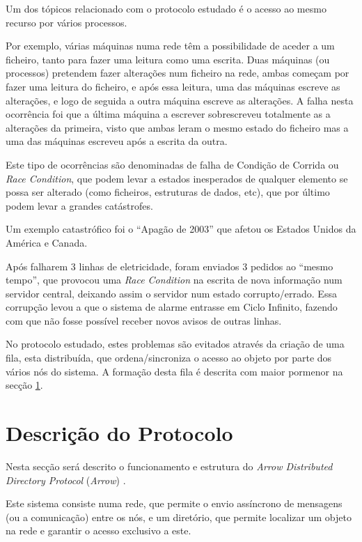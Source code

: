 Um dos tópicos relacionado com o protocolo estudado é o acesso ao mesmo recurso por vários processos.

Por exemplo, várias máquinas numa rede têm a possibilidade de aceder a um ficheiro, tanto para fazer uma leitura como uma escrita.
Duas máquinas (ou processos) pretendem fazer alterações num ficheiro na rede, ambas começam por fazer uma leitura do ficheiro, e após essa leitura, uma das máquinas escreve as alterações, e logo de seguida a outra máquina escreve as alterações. A falha nesta ocorrência foi que a última máquina a escrever sobrescreveu totalmente as a alterações da primeira, visto que ambas leram o mesmo estado do ficheiro mas a uma das máquinas escreveu após a escrita da outra.

Este tipo de ocorrências são denominadas de falha de Condição de Corrida ou \emph{Race Condition},
que podem levar a estados inesperados de qualquer elemento se possa ser alterado (como ficheiros, estruturas de dados, etc),
que por último podem levar a grandes catástrofes.

Um exemplo catastrófico foi o ``Apagão de 2003'' \cite{blackout} que afetou os Estados Unidos da América e Canada. 

Após falharem 3 linhas de eletricidade, foram enviados 3 pedidos ao ``mesmo tempo'', que provocou uma \emph{Race Condition} na escrita de nova informação num servidor central, deixando assim o servidor num estado corrupto/errado.
Essa corrupção levou a que o sistema de alarme entrasse em Ciclo Infinito, fazendo com que não fosse possível receber novos avisos de outras linhas.

No protocolo estudado, estes problemas são evitados através da criação de uma fila, esta distribuída, que ordena/sincroniza o acesso ao objeto por parte dos vários nós do sistema.
A formação desta fila é descrita com maior pormenor na secção \ref{motivacao:sec:descricao_protocolo}. 

\section{Descrição do Protocolo}
\label{motivacao:sec:descricao_protocolo}

Nesta secção será descrito o funcionamento e estrutura do \textit{Arrow Distributed Directory Protocol} (\emph{Arrow}) \cite{Arrow}. 

Este sistema consiste numa rede, que permite o envio assíncrono de mensagens (ou a comunicação) entre os nós, e um diretório, que permite localizar um objeto na rede e garantir o acesso exclusivo a este. 


